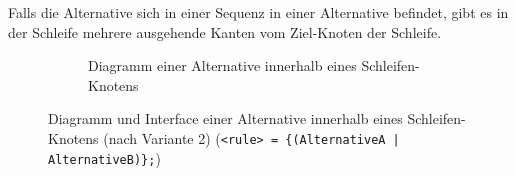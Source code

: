 \documentclass[../InterneDSLs.tex]{subfiles}
\begin{document}
Falls die Alternative sich in einer Sequenz in einer Alternative befindet, gibt es in der Schleife mehrere ausgehende Kanten vom Ziel-Knoten der Schleife.
\begin{figure}[ht]
\centering
  \begin{subfigure}[c]{0.49\textwidth}
    \caption{Diagramm einer Alternative innerhalb eines Schleifen-Knotens}
    \label{FIG:DiagramAlternativeInLoop}
  \end{subfigure}
  \begin{subfigure}[c]{0.49\textwidth}
    
  \end{subfigure}
  \caption{Diagramm und Interface einer Alternative innerhalb eines Schleifen-Knotens (nach Variante 2) (\texttt{<rule> = \{(AlternativeA | AlternativeB)\};})}
  \label{FIG:AlternativeInLoop}
\end{figure}
\end{document}
